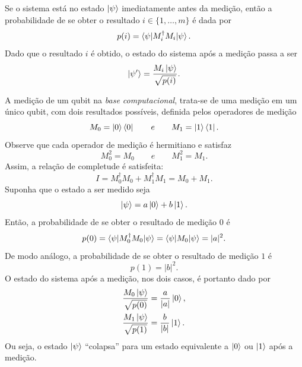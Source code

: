 Se o sistema está no estado $\ket{\psi}$ imediatamente antes da medição, então a probabilidade de se obter o resultado $i \in \{1, \dotso, m\}$ é dada por
\begin{equation}
p(i) = \braket{\psi | M_i^\dagger M_i | \psi}.
\end{equation}
Dado que o resultado $i$ é obtido, o estado do sistema após a medição passa a ser
\begin{equation}\label{eq:med}
\ket{\psi'} = \frac{M_i \ket{\psi}}{\sqrt{p(i)}}.
\end{equation}

\begin{example}
    A medição de um qubit na \emph{base computacional}, trata-se de uma medição em um único qubit, com dois resultados possíveis, definida pelos operadores de medição
\begin{equation}
M_0 = \ket{0}\bra{0} \qquad e \qquad M_1 = \ket{1}\bra{1}.
\end{equation}
Observe que cada operador de medição é hermitiano e satisfaz
\[
M_0^2 = M_0 \qquad e \qquad M_1^2 = M_1.
\]
Assim, a relação de completude é satisfeita:
\begin{equation}
I = M_0^\dagger M_0 + M_1^\dagger M_1 = M_0 + M_1.
\end{equation}
Suponha que o estado a ser medido seja
\begin{equation}
\ket{\psi} = a\ket{0} + b\ket{1}.
\end{equation}
Então, a probabilidade de se obter o resultado de medição $0$ é
\begin{equation}
p(0) = \braket{\psi | M_0^\dagger M_0 | \psi }
     = \braket{\psi | M_0 | \psi }
     = |a|^2.
\end{equation}
De modo análogo, a probabilidade de se obter o resultado de medição $1$ é
\begin{equation}
p(1) = |b|^2.
\end{equation}
O estado do sistema após a medição, nos dois casos, é portanto dado por
\begin{align}
\frac{M_0\ket{\psi}}{\sqrt{p(0)}} &= \frac{a}{|a|}\ket{0}, \\
\frac{M_1\ket{\psi}}{\sqrt{p(1)}} &= \frac{b}{|b|}\ket{1}.
\end{align}
Ou seja, o estado $\ket{\psi}$ ``colapsa'' para um estado equivalente a $\ket{0}$ ou $\ket{1}$ após a medição.

\end{example}

